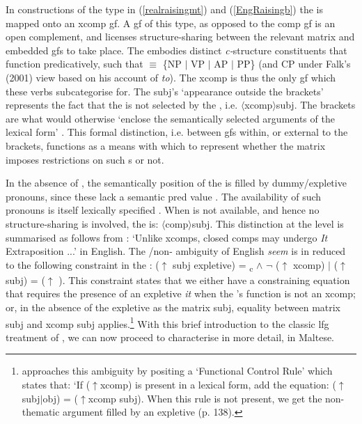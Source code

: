 \documentclass[output=paper]{LSP/langsci}
\begin{document}
In  constructions of the type in (\ref{realraisingmt}) and (\ref{EngRaisingb}) the  is mapped onto an {\sc xcomp gf}. A {\sc gf} of this type, as opposed to the {\sc comp gf} is an open complement, and licenses structure-sharing between the relevant matrix and embedded {\sc gf}s to take place. The {} embodies distinct \emph{c-}structure constituents that function predicatively, such that {} $\equiv$ \{NP $|$ VP $|$ AP $|$ PP\} (and CP under Falk's (2001) view based on his account of \emph{to}). The {\sc xcomp}  is thus the only {\sc gf} which these  verbs subcategorise for. The {\sc subj}'s `appearance outside the brackets'  represents the fact that the  is not selected by the , i.e. $\langle${\sc xcomp}$\rangle${\sc subj}. The brackets are what would otherwise `enclose the semantically selected arguments of the lexical form' . This formal distinction, i.e. between {\sc gf}s within, or external to the brackets, functions as a means with which to represent whether the matrix imposes restrictions on such {}s or not.

In the absence of , the semantically  position of the  is filled by dummy/expletive pronouns, since these lack a semantic {\sc pred} value . The availability of such pronouns is itself lexically specified . When  is not available, and hence no structure-sharing is involved, the  is: $\langle${\sc comp}$\rangle${\sc subj}. This distinction at the  level is summarised as follows from : `Unlike {\sc xcomp}s, closed {\sc comp}s may undergo \emph{It} Extraposition ...' in English. The /non- ambiguity of English \emph{seem} is in  reduced to the following constraint in the : ($\uparrow$ {{\sc subj expletive}}) = \textsubscript{c}{} $\wedge$  $\neg$ ($\uparrow$ {{\sc xcomp}}) $|$ ($\uparrow$ {{\sc subj}}) = ($\uparrow$ {}). This constraint states that we either have a constraining equation that requires the presence of an expletive \emph{it} when the 's function is not an {\sc xcomp}; or, in the absence of the expletive as the matrix {\sc subj}, equality between matrix {\sc subj} and {\sc xcomp subj} applies.\footnote{ approaches this ambiguity by positing a `Functional Control Rule' which states that: `If ($\uparrow${\sc xcomp}) is present in a lexical form, add the equation: ($\uparrow${\sc subj}$|${\sc obj}) = ($\uparrow${\sc xcomp subj}). When this rule is not present, we get the non-thematic argument filled by an expletive (p. 138).} With this brief introduction to the classic {\sc lfg} treatment of , we can now proceed to characterise in more detail,  in Maltese.
\end{document}
